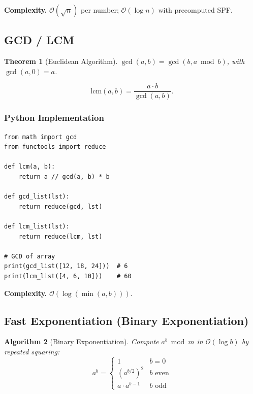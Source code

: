 \documentclass[10pt,a4paper]{article}
\theoremstyle{cpstyle}
\newtheorem{theorem}{Theorem}[section]
\newtheorem{algorithm}[theorem]{Algorithm}
\newcommand{\bigO}[1]{\mathcal{O}\!\left(#1\right)}
\begin{document}
\textbf{Complexity.} $\bigO{\sqrt{n}}$ per number; $\bigO{\log n}$ with precomputed SPF.

\subsection{GCD / LCM}

\begin{theorem}[Euclidean Algorithm]
$\gcd(a, b) = \gcd(b, a \bmod b)$, with $\gcd(a, 0) = a$.
\end{theorem}

\[
  \text{lcm}(a,b) = \frac{a \cdot b}{\gcd(a,b)}.
\]

\subsubsection{Python Implementation}
\begin{lstlisting}[caption={GCD and LCM}]
from math import gcd
from functools import reduce

def lcm(a, b):
    return a // gcd(a, b) * b

def gcd_list(lst):
    return reduce(gcd, lst)

def lcm_list(lst):
    return reduce(lcm, lst)

# GCD of array
print(gcd_list([12, 18, 24]))  # 6
print(lcm_list([4, 6, 10]))    # 60
\end{lstlisting}

\textbf{Complexity.} $\bigO{\log(\min(a,b))}$.

\subsection{Fast Exponentiation (Binary Exponentiation)}

\begin{algorithm}[Binary Exponentiation]
Compute $a^b \bmod m$ in $\bigO{\log b}$ by repeated squaring:
\[
  a^b = \begin{cases} 1 & b = 0 \\ (a^{b/2})^2 & b \text{ even} \\ a \cdot a^{b-1} & b \text{ odd} \end{cases}
\]
\end{algorithm}
\end{document}
